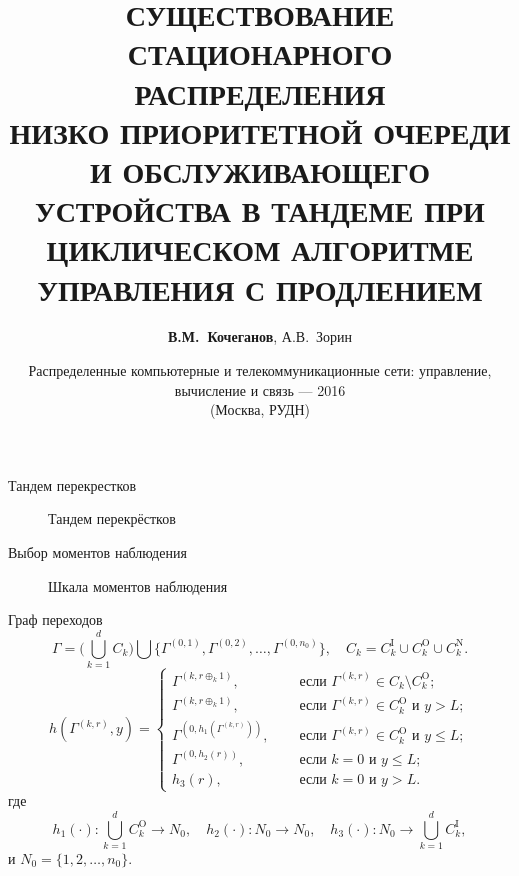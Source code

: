 \documentclass[10pt]{beamer}
\begin{document}
\title[УСЛОВИЕ СУЩЕСТВОВАНИЯ ...]{\normalsize \color{blue} СУЩЕСТВОВАНИЕ СТАЦИОНАРНОГО РАСПРЕДЕЛЕНИЯ \\
НИЗКО ПРИОРИТЕТНОЙ ОЧЕРЕДИ И ОБСЛУЖИВАЮЩЕГО УСТРОЙСТВА В ТАНДЕМЕ ПРИ ЦИКЛИЧЕСКОМ АЛГОРИТМЕ УПРАВЛЕНИЯ С ПРОДЛЕНИЕМ}
\author[В.М.~Кочеганов, А.В.~Зорин (ННГУ)]{\textbf{В.М.~Кочеганов}, А.В.~Зорин}
\date[21-25.11.2016]{
Распределенные компьютерные и телекоммуникационные сети: управление, вычисление и связь --- 2016\\
(Москва, РУДН)
}

\begin{frame}
\titlepage
\end{frame}



\begin{frame}{Тандем перекрестков}
  \begin{figure}[h]
    \centering
    \caption{Тандем перекрёстков}
    \label{VK:fig:1}
  \end{figure}
\end{frame} 

\begin{frame} {Выбор моментов наблюдения}
  \begin{figure}[h]
    \centering
    \caption{Шкала моментов наблюдения}
    \label{VK:fig:3}
  \end{figure}
\end{frame}

\begin{frame}{Граф переходов}
  $$\Gamma = \bigl( \bigcup_{k=1}^d C_k \bigr) \bigcup \{\Gamma^{(0,1)}, \Gamma^{(0,2)}, \ldots, \Gamma^{(0,n_0)}\}, \quad C_k = C_k^{\mathrm{I}} \cup C_k^{\mathrm{O}}  \cup C_k^{\mathrm{N}}.$$
  \begin{equation*}
h(\Gamma^{(k,r)},y) = 
\begin{cases}
\Gamma^{(k,r\oplus_k 1)},& \quad \text{ если } \Gamma^{(k,r)}\in C_k\setminus C_k^{\mathrm{O}};\\
\Gamma^{(k,r\oplus_k 1)},& \quad \text{ если } \Gamma^{(k,r)}\in C_k^{\mathrm{O}} \text{ и } y>L;\\
\Gamma^{(0,h_1(\Gamma^{(k,r)}))},& \quad \text{ если } \Gamma^{(k,r)}\in C_k^{\mathrm{O}} \text{ и } y\leqslant L;\\
\Gamma^{(0,h_2(r))},& \quad \text{ если } k=0 \text{ и } y\leqslant L;\\
h_3(r),& \quad \text{ если } k=0 \text{ и } y > L.
\end{cases}
\end{equation*}
где 
$$h_1(\cdot)\colon \bigcup_{k=1}^d C_k^{\mathrm{O}}\to N_0, \quad h_2(\cdot)\colon N_0\to N_0, \quad h_3(\cdot)\colon N_0 \to\bigcup_{k=1}^d C_k^{\mathrm{I}},$$ и $N_0=\{1,2, \ldots, n_0\}$.
\end{frame}
\end{document}
